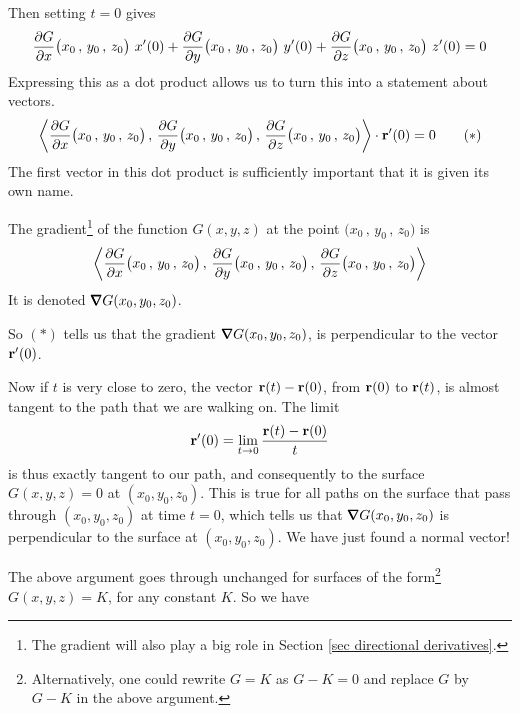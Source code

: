 Then setting $t=0$ gives 
\begin{equation*}
\pdiff{G}{x}\big( x_0\,,\,y_0\,,\,z_0\big)\ x'(0)
+\pdiff{G}{y}\big( x_0\,,\,y_0\,,\,z_0\big)\ y'(0)
+\pdiff{G}{z}\big( x_0\,,\,y_0\,,\,z_0\big)\ z'(0) = 0
\end{equation*}
Expressing this as a dot product allows us to turn this into a 
statement about vectors.
\begin{equation*}
\llt \pdiff{G}{x}\big( x_0\,,\,y_0\,,\,z_0\big)\,,\,
     \pdiff{G}{y}\big( x_0\,,\,y_0\,,\,z_0\big)\,,\,
     \pdiff{G}{z}\big( x_0\,,\,y_0\,,\,z_0\big)\rgt \cdot \vr'(0) = 0
\tag{$*$}\end{equation*}
The first vector in this dot product is sufficiently important that it is 
given its own name.
\begin{defn}[Gradient]\label{def gradient}
The gradient\footnote{The gradient will also play a big role in 
Section \ref{sec directional derivatives}.} of the function $G(x,y,z)$ at the point 
$\big( x_0\,,\,y_0\,,\,z_0\big)$ is
\begin{equation*}
\llt \pdiff{G}{x}\big( x_0\,,\,y_0\,,\,z_0\big)\,,\,
     \pdiff{G}{y}\big( x_0\,,\,y_0\,,\,z_0\big)\,,\,
     \pdiff{G}{z}\big( x_0\,,\,y_0\,,\,z_0\big)\rgt
\end{equation*}
It is denoted $\vnabla G(x_0,y_0,z_0)$.
\end{defn}\noindent
So $(*)$ tells us that the gradient
$\vnabla G(x_0,y_0,z_0)$, is perpendicular to the vector $\mathbf{r}'(0)$.

Now if $t$ is very close to zero, the vector $\mathbf{r}(t)-\mathbf{r}(0)$, from
$\mathbf{r}(0)$ to $\mathbf{r}(t)$, is almost tangent to the path that we are walking on.
The limit 
\begin{equation*}
\mathbf{r}'(0)=\lim_{t\rightarrow 0}\frac{\mathbf{r}(t)-\mathbf{r}(0)}{t}
\end{equation*}
is thus exactly tangent to our path, and consequently to the surface
$G(x,y,z)=0$ at $(x_0,y_0,z_0)$. This is true for all paths on the surface that
pass through $(x_0,y_0,z_0)$ at time $t=0$, which tells us that
$\vnabla G(x_0,y_0,z_0)$ is perpendicular to the surface at $(x_0,y_0,z_0)$. 
We have just found a normal vector!

The above argument goes through unchanged for surfaces of 
the form\footnote{Alternatively, one could rewrite $G=K$ as $G-K=0$
and replace $G$ by $G-K$ in the above argument.}
$G(x,y,z)=K$, for any constant $K$. So we have

